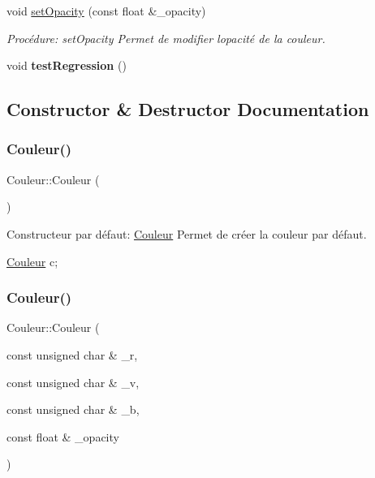 \begin{DoxyCompactItemize}
void \hyperlink{classCouleur_a54817aff2a5f8d5dfcf6358d523c923a}{set\+Opacity} (const float \&\+\_\+opacity)
\begin{DoxyCompactList}\small\item\em Procédure\+: set\+Opacity Permet de modifier l\textquotesingle{}opacité de la couleur. \end{DoxyCompactList}\item 
\mbox{\label{classCouleur_ad6b8c5cea7c4f2d7a71f778d3c406d07}} 
void {\bfseries test\+Regression} ()
\end{DoxyCompactItemize}


\subsection{Constructor \& Destructor Documentation}
\mbox{\label{classCouleur_a687a457edb08b51dbcd0299bb0b6a882}} 
\subsubsection{\texorpdfstring{Couleur()}{Couleur()}\hspace{0.1cm}{\footnotesize\ttfamily [1/3]}}
{\footnotesize\ttfamily Couleur\+::\+Couleur (\begin{DoxyParamCaption}{ }\end{DoxyParamCaption})}



Constructeur par défaut\+: \hyperlink{classCouleur}{Couleur} Permet de créer la couleur par défaut. 


\begin{DoxyCode}
\hyperlink{classCouleur}{Couleur} c;
\end{DoxyCode}
 \mbox{\label{classCouleur_ac51d4f087f4ff01b84628557dc7a33f4}} 
\subsubsection{\texorpdfstring{Couleur()}{Couleur()}\hspace{0.1cm}{\footnotesize\ttfamily [2/3]}}
{\footnotesize\ttfamily Couleur\+::\+Couleur (\begin{DoxyParamCaption}\item[{const unsigned char \&}]{\+\_\+r,  }\item[{const unsigned char \&}]{\+\_\+v,  }\item[{const unsigned char \&}]{\+\_\+b,  }\item[{const float \&}]{\+\_\+opacity }\end{DoxyParamCaption})}



